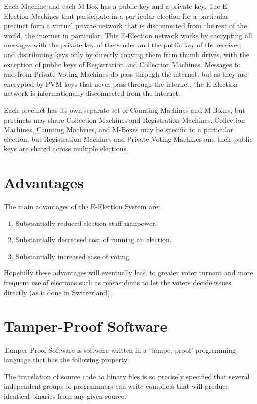 \documentclass[12pt]{article}
\newenvironment{indpar}[1][0.3in]%
	{\begin{list}{}%
		     {\setlength{\itemsep}{0in}%
		      \setlength{\topsep}{0in}%
		      \setlength{\parsep}{1ex}%
		      \setlength{\labelwidth}{#1}%
		      \setlength{\leftmargin}{#1}%
		      \addtolength{\leftmargin}{\labelsep}}%
	 \item}%
	{\end{list}}
\begin{document}
Each Machine and each M-Box has a public key and a private key.
The E-Election Machines that participate in
a particular election for a particular
precinct form a virtual private network that is disconnected from
the rest of the world, the internet in particular.  This E-Election
network works by encrypting all messages with the private key of the
sender and the public key of the receiver, and distributing
keys only by directly copying them from
thumb drives, with the exception of public keys of Registration and
Collection Machines.  Messages to and from Private Voting Machines do pass
through the internet, but as they are encrypted by PVM keys that never
pass through the internet, the E-Election network is informationally
disconnected from the internet.

Each precinct has its own separate set of Counting Machines and M-Boxes,
but precincts may share Collection Machines and Registration
Machines.  Collection Machines,
Counting Machines, and M-Boxes may be
specific to a particular election, but Registration Machines
and Private Voting Machines and
their public keys are shared across multiple elections.

\section{Advantages}

The main advantages of the E-Election System are:
\begin{enumerate}
\item Substantially reduced election staff manpower.
\item Substantially decreased cost of running an election.
\item Substantially increased ease of voting.
\end{enumerate}

Hopefully these advantages will eventually lead to
greater voter turnout and more frequent use of elections such
as referendums to let the voters decide issues directly
(as is done in Switzerland).


\section{Tamper-Proof Software}

Tamper-Proof Software is software written in a `tamper-proof'
programming language
that has the following property:
\begin{indpar}
The translation of source code to binary files is so precisely
specified that several independent groups of programmers can
write compilers that will produce identical binaries from any
given source.
\end{indpar}
\end{document}
